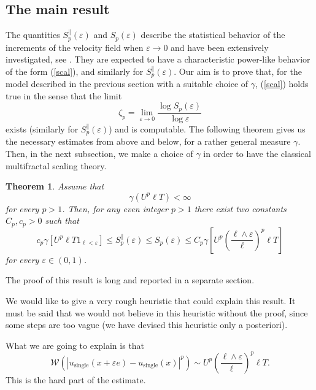 \documentclass[a4paper,12pt]{article}
\newtheorem{theorem}{Theorem}
\begin{document}
\subsection{The main result}

The quantities $S_{p}^{\parallel}(\varepsilon)$ and $S_{p}(\varepsilon)$
describe the statistical behavior of the increments of the velocity field when
$\varepsilon\rightarrow0$ and have been extensively investigated, see
\cite{frisch}. They are expected to have a characteristic power-like behavior
of the form (\ref{scal}), and similarly for $S_{p}^{\parallel}(\varepsilon)$.
Our aim is to prove that, for the model described in the previous section with
a suitable choice of $\gamma$, (\ref{scal}) holds true in the sense that the
limit
\begin{equation}
\zeta_{p}=\lim_{\varepsilon\rightarrow0}\frac{\log S_{p}(\varepsilon)}%
{\log\varepsilon}%
\end{equation}
exists (similarly for $S_{p}^{\parallel}(\varepsilon)$) and is computable. The
following theorem gives us the necessary estimates from above and below, for a
rather general measure $\gamma$. Then, in the next subsection, we make a
choice of $\gamma$ in order to have the classical multifractal scaling theory.

\begin{theorem}
\label{maintheorem} Assume that
\[
\gamma(U^{p}\ell T)<\infty
\]
for every $p>1$. Then, for any even integer $p>1$ there exist two constants
$C_{p},c_{p}>0$ such that
\begin{equation}
c_{p}\gamma\left[  U^{p}\ell T1_{\ell<\varepsilon}\right]  \leq S_{p}%
^{\parallel}(\varepsilon)\leq S_{p}(\varepsilon)\leq C_{p}\gamma\left[
U^{p}\left(  \frac{\ell\wedge\varepsilon}{\ell}\right)  ^{p}\ell T\right]
\label{eq:general-scaling}%
\end{equation}
for every $\varepsilon\in\left(  0,1\right)  $.
\end{theorem}

The proof of this result is long and reported in a separate section.

We would like to give a very rough heuristic that could explain this result.
It must be said that we would not believe in this heuristic without the proof,
since some steps are too vague (we have devised this heuristic only a posteriori).

What we are going to explain is that
\[
\mathcal{W}(\left|  u_{\text{single}}\left(  x+\varepsilon e\right)
-u_{\text{single}}\left(  x\right)  \right|  ^{p})\sim U^{p}\left(  \frac
{\ell\wedge\varepsilon}{\ell}\right)  ^{p}\ell T.
\]
This is the hard part of the estimate.
\end{document}
